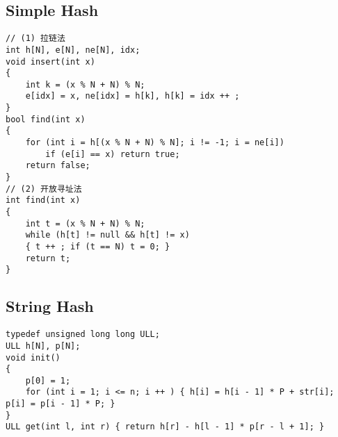 \subsection{Simple Hash}
\begin{lstlisting}
// (1) 拉链法
int h[N], e[N], ne[N], idx;
void insert(int x)
{
    int k = (x % N + N) % N;
    e[idx] = x, ne[idx] = h[k], h[k] = idx ++ ;
}
bool find(int x)
{
    for (int i = h[(x % N + N) % N]; i != -1; i = ne[i])
        if (e[i] == x) return true;
    return false;
}
// (2) 开放寻址法
int find(int x)
{
    int t = (x % N + N) % N;
    while (h[t] != null && h[t] != x)
    { t ++ ; if (t == N) t = 0; }
    return t;
}
\end{lstlisting}
\subsection{String Hash}
\begin{lstlisting}
typedef unsigned long long ULL;
ULL h[N], p[N];
void init()
{
    p[0] = 1;
    for (int i = 1; i <= n; i ++ ) { h[i] = h[i - 1] * P + str[i]; p[i] = p[i - 1] * P; }
}
ULL get(int l, int r) { return h[r] - h[l - 1] * p[r - l + 1]; }
\end{lstlisting}
